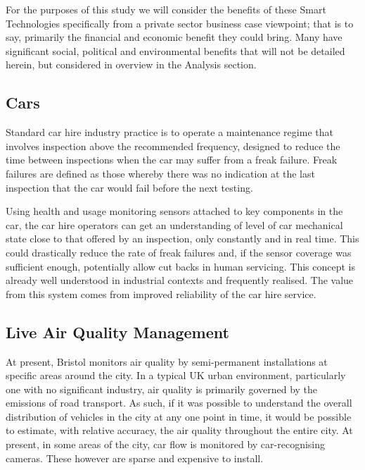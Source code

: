\documentclass[conference]{IEEEtran}
\begin{document}
For the purposes of this study we will consider the benefits of these
Smart Technologies specifically from a private sector business case
viewpoint; that is to say, primarily the financial and economic
benefit they could bring. Many have significant social, political and
environmental benefits that will not be detailed herein, but
considered in overview in the Analysis section.

\subsection{Cars}

Standard car hire industry practice is to operate a maintenance regime
that involves inspection above the recommended frequency, designed to
reduce the time between inspections when the car may suffer from a
freak failure. Freak failures are defined as those whereby there was
no indication at the last inspection that the car would fail before
the next testing.

Using health and usage monitoring sensors attached to key components
in the car, the car hire operators can get an understanding of level
of car mechanical state close to that offered by an inspection, only
constantly and in real time. This could drastically reduce the rate of
freak failures and, if the sensor coverage was sufficient enough,
potentially allow cut backs in human servicing.  This concept is
already well understood in industrial contexts and frequently
realised. The value from this system comes from improved reliability
of the car hire service.




\subsection{Live Air Quality Management}

At present, Bristol monitors air quality by semi-permanent
installations at specific areas around the city.  In a typical UK
urban environment, particularly one with no significant industry, air
quality is primarily governed by the emissions of road transport.  As
such, if it was possible to understand the overall distribution of
vehicles in the city at any one point in time, it would be possible to
estimate, with relative accuracy, the air quality throughout the
entire city. At present, in some areas of the city, car flow is
monitored by car-recognising cameras. These however are sparse and
expensive to install.
\end{document}
